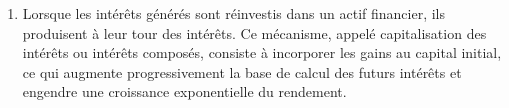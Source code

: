 \documentclass{article}
\begin{document}
\begin{enumerate}[label=\textbf{R1.\arabic*}]
                \item Lorsque les intérêts générés sont réinvestis dans un actif financier, ils produisent à leur tour des intérêts. Ce mécanisme, appelé capitalisation des intérêts ou intérêts composés, consiste à incorporer les gains au capital initial, ce qui augmente progressivement la base de calcul des futurs intérêts et engendre une croissance exponentielle du rendement.
            \end{enumerate}
\end{document}
